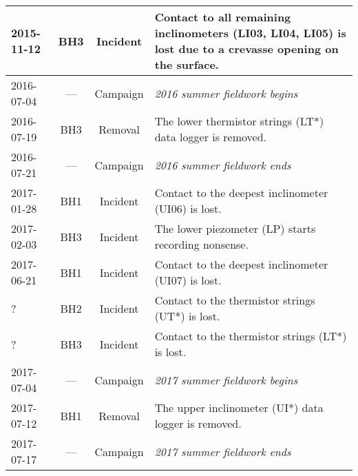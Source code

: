 \documentclass[utf8]{article}
\begin{document}
\begin{table}
{\begin{tabular}{lccp{95mm}}
        2015-11-12 & BH3  & Incident & Contact to all remaining inclinometers
                                       (LI03, LI04, LI05) is lost due to
                                       a crevasse opening on the surface. \\
        \hline
        2016-07-04 & ---  & Campaign & \emph{2016 summer fieldwork begins} \\
        2016-07-19 & BH3  & Removal  & The lower thermistor strings (LT*) data
                                       logger is removed. \\
        2016-07-21 & ---  & Campaign & \emph{2016 summer fieldwork ends} \\
        \hline
        2017-01-28 & BH1  & Incident & Contact to the deepest inclinometer
                                       (UI06) is lost. \\
        2017-02-03 & BH3  & Incident & The lower piezometer (LP) starts
                                       recording nonsense. \\
        2017-06-21 & BH1  & Incident & Contact to the deepest inclinometer
                                       (UI07) is lost. \\
        ?          & BH2  & Incident & Contact to the thermistor strings (UT*)
                                       is lost. \\
        ?          & BH3  & Incident & Contact to the thermistor strings (LT*)
                                       is lost. \\
        \hline
        2017-07-04 & ---  & Campaign & \emph{2017 summer fieldwork begins} \\
        2017-07-12 & BH1  & Removal  & The upper inclinometer (UI*) data logger
                                       is removed. \\
        2017-07-17 & ---  & Campaign & \emph{2017 summer fieldwork ends} \\
        \hline
      \end{tabular}}
    \end{table}
\end{document}
